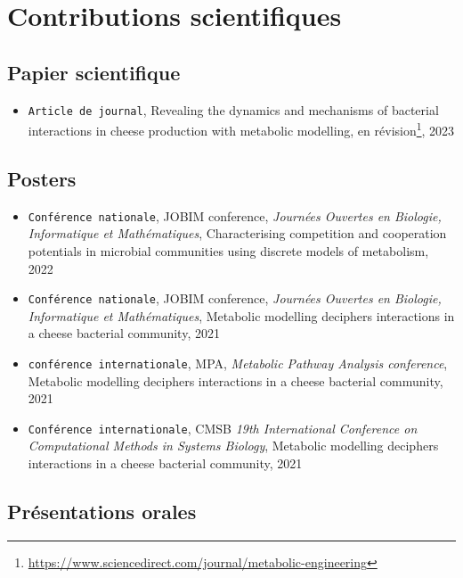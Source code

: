 \documentclass[../main.tex]{subfiles}
\begin{document}
\chapter*{Contributions scientifiques}

\section*{Papier scientifique}

\begin{itemize}
	\item \texttt{Article de journal}, Revealing the dynamics and mechanisms of bacterial interactions in cheese production with metabolic modelling, en révision\footnote{\url{https://www.sciencedirect.com/journal/metabolic-engineering}}, 2023
\end{itemize}

\section*{Posters}

\begin{itemize}
	\item \texttt{Conférence nationale}, JOBIM conference, \textit{Journées Ouvertes en Biologie, Informatique et Mathématiques}, Characterising competition and cooperation potentials in microbial communities using discrete models of metabolism, 2022 
	\item \texttt{Conférence nationale}, JOBIM conference, \textit{Journées Ouvertes en Biologie, Informatique et Mathématiques}, Metabolic modelling deciphers interactions in a cheese bacterial community, 2021
	\item \texttt{conférence internationale}, MPA, \textit{Metabolic Pathway Analysis conference}, Metabolic modelling deciphers interactions in a cheese bacterial community, 2021
	\item \texttt{Conférence internationale}, CMSB \textit{19th International Conference on Computational Methods in Systems Biology}, Metabolic modelling deciphers interactions in a cheese bacterial community, 2021
\end{itemize}

\section*{Présentations orales}
\end{document}
